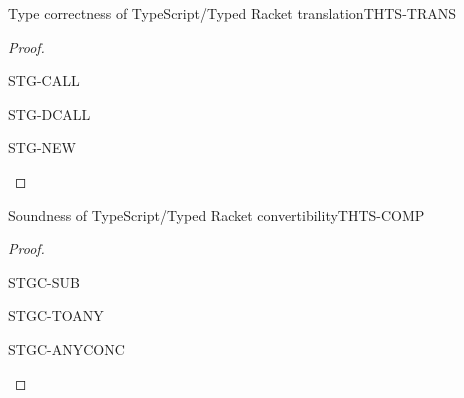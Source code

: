 \documentclass[acmlarge, anonymous, authordraft]{acmart}
\begin{document}
\begin{lemma}{Type correctness of TypeScript/Typed Racket translation}{THTS-TRANS}
\begin{proof}
    
    \begin{case}{STG-CALL}
      \step{}{}\lbl{}
    \end{case}

    \begin{case}{STG-DCALL}
    \end{case}

    \begin{case}{STG-NEW}
    \end{case}
  \end{proof}
\end{lemma}

\begin{lemma}{Soundness of TypeScript/Typed Racket convertibility}{THTS-COMP}
  \begin{conds}
    \cond{$\EnvTypeS\Env\K\e\t$}
    \cond{$\ep = \TRG{\e}\Env$}
    \cond{$\TR\K = \Kp$}
    \cond{$\TR\Env = \Envp$}
    \cond{$\EnvType\Envp\cdot\Kp{\ep}{\t}$}
  \end{conds}
  \then\axiom{$\EnvType\Envp\cdot\Kp{\TAG\e\Env{\tp}}{\tp}$}

  \begin{proof}{ }

  \begin{case}{STGC-SUB}
  \end{case}

  \begin{case}{STGC-TOANY}
  \end{case}

  \begin{case}{STGC-ANYCONC}
  \end{case}

  \end{proof}
\end{lemma}
\end{document}
